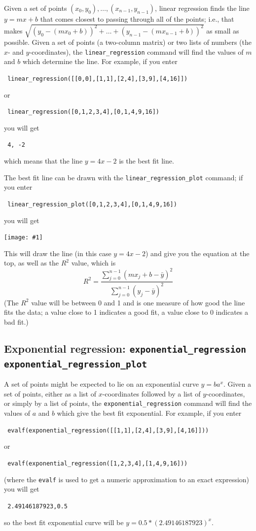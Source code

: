 \documentclass[a4paper,11pt]{book}
\newcommand{\includeimage}[1]
{\texttt{[image: \#1]}}
\begin{document}
Given a set of points $(x_0,y_0),\dots,(x_{n-1},y_{n-1})$, linear
regression finds the line $y=mx+b$ that comes 
closest to passing through all of the points; i.e., that makes 
$\sqrt{(y_0 - (m x_0 + b))^2 + \dots + (y_{n-1} - (m x_{n-1} + b))^2}$
as small as possible.  Given a set of points (a two-column matrix) or
two lists of numbers (the $x$- and $y$-coordinates), the
\texttt{linear\_regression} command will find the values of $m$ and
$b$ which determine the line.  For example, if you enter
\begin{center}
  \tt
  linear\_regression([[0,0],[1,1],[2,4],[3,9],[4,16]])
\end{center}
or
\begin{center}
  \tt
  linear\_regression([0,1,2,3,4],[0,1,4,9,16])
\end{center}
you will get
\begin{center}
  \tt
  4, -2
\end{center}
which means that the line $y = 4x - 2$ is the best fit line.

The best fit line can be drawn with the
\texttt{linear\_regression\_plot} command; if you enter
\begin{center}
  \tt
  linear\_regression\_plot([0,1,2,3,4],[0,1,4,9,16])
\end{center}
you will get
\begin{center}
  \includeimage{xcas-linregplot.png}
\end{center}
This will draw the line (in this case $y=4x-2$) and give you the
equation at the top, as well as the $R^2$ value, which is
\[ R^2 = \frac{\sum_{j=0}^{n-1} (m x_j + b - \bar{y})^2}{\sum_{j=0}^{n-1} (y_j - \bar{y})^2}\]
(The $R^2$ value will be between 0 and 1 and is one measure of how
good the line fits the data; a value close to 1 indicates a good fit,
a value close to 0 indicates a bad fit.)

\subsection{Exponential regression: \texttt{exponential\_regression} \texttt{exponential\_regression\_plot}}

A set of points might be expected to lie on an exponential curve 
$y=b a^x$.  Given a set of points, either as a list of $x$-coordinates
followed by a list of $y$-coordinates, or simply by a list of points,
the \texttt{exponential\_regression} command will find the values of
$a$ and $b$ which give the best fit exponential.  For example, if you
enter
\begin{center}
  \tt
  evalf(exponential\_regression([[1,1],[2,4],[3,9],[4,16]]))
\end{center}
or
\begin{center}
  \tt
  evalf(exponential\_regression([1,2,3,4],[1,4,9,16]))
\end{center}
(where the \texttt{evalf} is used to get a numeric approximation to an
exact expression) you will get
\begin{center}
  \tt
  2.49146187923,0.5
\end{center}
so the best fit exponential curve will be $y = 0.5*(2.49146187923)^x$.
\end{document}

